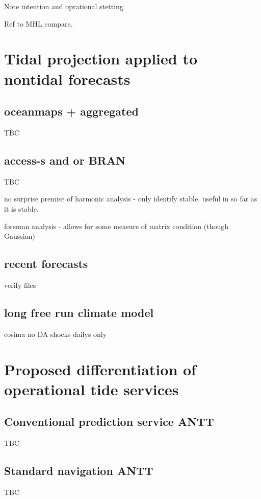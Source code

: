 Note intention and oprational stetting

Ref to MHL compare.


\section{Tidal projection applied to nontidal forecasts}
\subsection{oceanmaps + aggregated}
TBC

\subsection{access-s and or BRAN}
TBC



no surprise
premise of harmonic analysis - only identify stable.
useful in so far as it is stable.

foreman analysis - allows for some measure of matrix condition (though Gaussian)


\subsection{ recent forecasts }
verify files


\subsection{ long free run climate model }
cosima
no DA shocks
dailys only




\section{Proposed differentiation of operational tide services}
\subsection{Conventional prediction service ANTT}

TBC

\subsection{Standard navigation ANTT}

TBC
